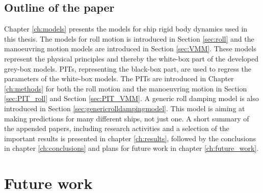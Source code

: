 \section{Outline of the paper}
Chapter \ref{ch:models} presents the models for ship rigid body dynamics used in this thesis. The models for roll motion is introduced in Section \ref{sec:roll} and the manoeuvring motion models are introduced in Section \ref{sec:VMM}. These models represent the physical principles and thereby the white-box part of the developed grey-box models.
PITs, representing the black-box part, are used to regress the parameters of the white-box models. The PITs are introduced in Chapter \ref{ch:methods} for both the roll motion and the manoeuvring motion in Section \ref{sec:PIT_roll} and Section \ref{sec:PIT_VMM}. 
A generic roll damping model is also introduced in Section \ref{sec:genericrolldampingmodel}. This model is aiming at making predictions for many different ships, not just one.
A short summary of the appended papers, including research activities and a selection of the important results is presented in chapter \ref{ch:results}, followed by the conclusions in chapter \ref{ch:conclusions} and plans for future work in chapter \ref{ch:future_work}.






\chapter{Future work\label{ch:future_work}}
